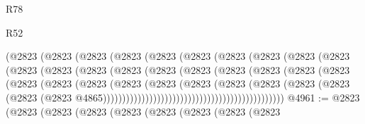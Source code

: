 \begin{lexlean}{R78}
\begin{lexlean}{R52}
\begin{coremodule}
{{{{{{{{{{{{{{{{{{{{{{{{{{{{{{{{{{{{{{{{{{{{{{{{{{{{{{{{{{{{{{{{{{{{{{{{{{{{{{{{{{{{{{{{{{{{{{{{{{{{{{{{{{{{{{{{{{{{{{{{{{{{{{{{{{{{{{{{{{{{{{{{{{{{{{{{{{{{{{{{{{{{{{{{{{{{{{{{{{{{{{{{{{{{{{{{{{{{{{                                  (@2823
                                    (@2823
                                      (@2823
                                        (@2823
                                          (@2823
                                            (@2823
                                              (@2823
                                                (@2823
                                                  (@2823
                                                    (@2823
                                                      (@2823
                                                        (@2823
                                                          (@2823
                                                            (@2823
                                                              (@2823
                                                                (@2823
                                                                  (@2823
                                                                    (@2823
                                                                      (@2823
                                                                        (@2823
                                                                          (@2823
                                                                            (@2823
                                                                              (@2823
                                                                                (@2823
                                                                                  (@2823
                                                                                    (@2823
                                                                                      (@2823
                                                                                        (@2823
                                                                                          (@2823
                                                                                            (@2823
                                                                                              (@2823
                                                                                                (@2823
                                                                                                  @4865)))))))))))))))))))))))))))))))))))))))))))))))
@4961 := @2823
    (@2823
      (@2823
        (@2823
          (@2823
            (@2823
              (@2823
                (@2823
                  (@2823
}}}}}}}}}}}}}}}}}}}}}}}}}}}}}}}}}}}}}}}}}}}}}}}}}}}}}}}}}}}}}}}}}}}}}}}}}}}}}}}}}}}}}}}}}}}}}}}}}}}}}}}}}}}}}}}}}}}}}}}}}}}}}}}}}}}}}}}}}}}}}}}}}}}}}}}}}}}}}}}}}}}}}}}}}}}}}}}}}}}}}}}}}}}}}}}}}}}}}}
\end{coremodule}
\end{lexlean}
\end{lexlean}
